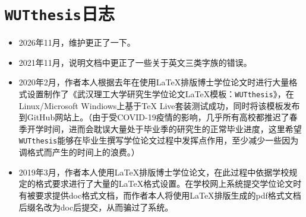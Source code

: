 \chapter{\texttt{WUTthesis}日志}



\begin{itemize}
\item 2026年11月，维护更正了一下。
\item 2021年11月，说明文档中更正了一些关于英文三类字族的错误。
\item 2020年2月，作者本人根据去年在使用{\LaTeX}排版博士学位论文时进行大量格式设置制作了《武汉理工大学研究生学位论文{\LaTeX}模板：\texttt{WUTthesis}》，在Linux/Microsoft Windiows上基于TeX Live套装测试成功，同时将该模板发布到GitHub网站上。（{\color{red}由于受COVID-19疫情的影响，几乎所有高校都推迟了春季开学时间，进而会耽误大量处于毕业季的研究生的正常毕业进度，这里希望\texttt{WUTthesis}能够在毕业生撰写学位论文过程中发挥点作用，至少减少一些因为调格式而产生的时间上的浪费。}）
\item 2019年3月，作者本人使用{\LaTeX}排版博士学位论文，在此过程中依据学校规定的格式要求进行了大量的{\LaTeX}格式设置。在学校网上系统提交学位论文时有被要求提供doc格式文档，而作者本人将使用{\LaTeX}排版生成的pdf格式文档后缀名改为doc后提交，从而骗过了系统。
\end{itemize}






